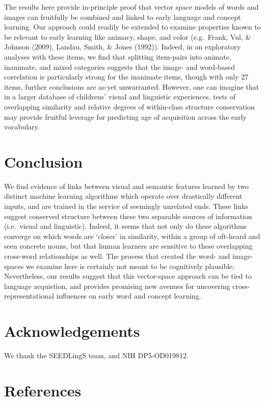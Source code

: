 \documentclass[10pt, letterpaper]{article}
\begin{document}
The results here provide in-principle proof that vector space models of
words and images can fruitfully be combined and linked to early language
and concept learning. Our approach could readily be extended to examine
properties known to be relevant to early learning like animacy, shape,
and color (e.g.~Frank, Vul, \& Johnson (2009), Landau, Smith, \& Jones
(1992)). Indeed, in an exploratory analyses with these items, we find
that splitting item-pairs into animate, inanimate, and mixed categories
suggests that the image- and word-based correlation is particularly
strong for the inanimate items, though with only 27 items, further
conclusions are as-yet unwarranted. However, one can imagine that in a
larger database of childrens' visual and linguistic experiences, tests
of overlapping similarity and relative degrees of within-class structure
conservation may provide fruitful leverage for predicting age of
acquisition across the early vocabulary.

\section{Conclusion}\label{conclusion}

We find evidence of links between visual and semantic features learned
by two distinct machine learning algorithms which operate over
drastically different inputs, and are trained in the service of
seemingly unrelated ends. These links suggest conserved structure
between these two separable sources of information (i.e.~visual and
linguistic). Indeed, it seems that not only do these algorithms converge
on which words are `closer' in similarity, within a group of oft-heard
and seen concrete nouns, but that human learners are sensitive to these
overlapping cross-word relationships as well. The process that created
the word- and image-spaces we examine here is certainly not meant to be
cognitively plausible. Nevertheless, our results suggest that this
vector-space approach can be tied to language acquistion, and provides
promising new avenues for uncovering cross-representational influences
on early word and concept learning.

\section{Acknowledgements}\label{acknowledgements}

We thank the SEEDLingS team, and NIH DP5-OD019812.

\section{References}\label{references}
\end{document}
